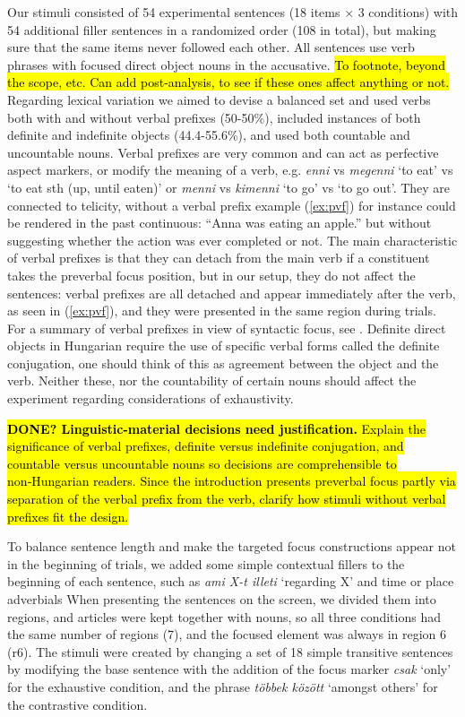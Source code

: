 \documentclass[a4paper, ruler]{CUP-JNL-LIN}%
\begin{document}
Our stimuli consisted of 54 experimental sentences (18 items × 3 conditions) with 54 additional filler sentences in a randomized order (108 in total), but making sure that the same items never followed each other. All sentences use verb phrases with focused direct object nouns in the accusative. \hl{To footnote, beyond the scope, etc. Can add post-analysis, to see if these ones affect anything or not.} Regarding lexical variation we aimed to devise a balanced set and used verbs both with and without verbal prefixes (50-50\%), included instances of both definite and indefinite objects (44.4-55.6\%), and used both countable and uncountable nouns. 
Verbal prefixes are very common and can act as perfective aspect markers, or modify the meaning of a verb, e.g. \textit{enni} vs \textit{megenni} `to eat' vs `to eat sth (up, until eaten)' or \textit{menni} vs \textit{kimenni} `to go' vs `to go out'. They are connected to telicity, without a verbal prefix example (\ref{ex:pvf}) for instance could be rendered in the past continuous: ``Anna was eating an apple.'' but without suggesting whether the action was ever completed or not. The main characteristic of verbal prefixes is that they can detach from the main verb if a constituent takes the preverbal focus position, but in our setup, they do not affect the sentences: verbal prefixes are all detached and appear immediately after the verb, as seen in (\ref{ex:pvf}), and they were presented in the same region during trials. For a summary of verbal prefixes in view of syntactic focus, see \citet[][50-61]{day_2021_role}. Definite direct objects in Hungarian require the use of specific verbal forms called the definite conjugation, one should think of this as agreement between the object and the verb. Neither these, nor the countability of certain nouns should affect the experiment regarding considerations of exhaustivity.

\hl{\textbf{DONE? Linguistic-material decisions need justification.} Explain the significance of verbal prefixes, definite versus indefinite conjugation, and countable versus uncountable nouns so decisions are comprehensible to non‑Hungarian readers. Since the introduction presents preverbal focus partly via separation of the verbal prefix from the verb, clarify how stimuli without verbal prefixes fit the design.}

To balance sentence length and make the targeted focus constructions appear not in the beginning of trials, we added some simple contextual fillers to the beginning of each sentence, such as \textit{ami X-t illeti} `regarding X' and time or place adverbials When presenting the sentences on the screen, we divided them into regions, and articles were kept together with nouns, so all three conditions had the same number of regions (7), and the focused element was always in region 6 (r6). The stimuli were created by changing a set of 18 simple transitive sentences by modifying the base sentence with the addition of the focus marker \textit{csak} `only' for the exhaustive condition, and the phrase \textit{többek között} `amongst others' for the contrastive condition.
\end{document}
